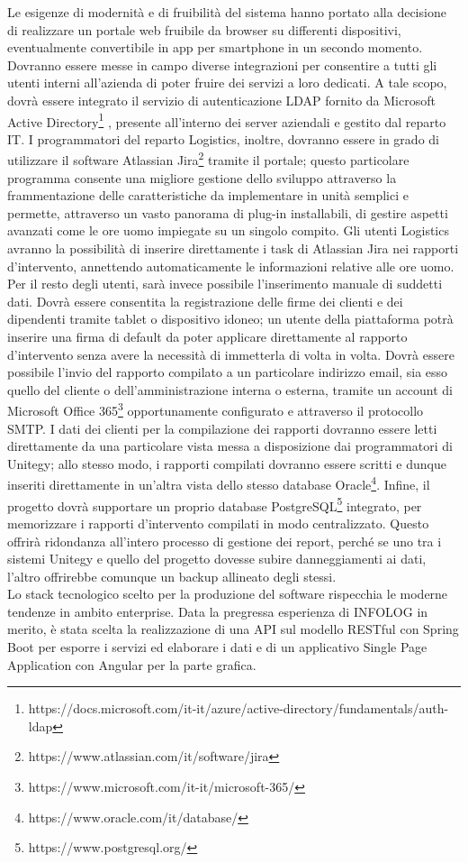 Le esigenze di modernità e di fruibilità del sistema hanno portato alla decisione di realizzare un portale web fruibile da browser su differenti dispositivi, eventualmente
convertibile in app per smartphone in un secondo momento.
Dovranno essere messe in campo diverse integrazioni per consentire a tutti gli utenti interni all'azienda di poter fruire dei servizi a loro dedicati.
A tale scopo, dovrà essere integrato il servizio di autenticazione LDAP fornito da Microsoft Active Directory\footnote{https://docs.microsoft.com/it-it/azure/active-directory/fundamentals/auth-ldap}
, presente all'interno dei server aziendali e gestito dal reparto IT.
I programmatori del reparto Logistics, inoltre, dovranno essere in grado di utilizzare il software Atlassian Jira\footnote{https://www.atlassian.com/it/software/jira} tramite il portale;
questo particolare programma consente una migliore gestione dello sviluppo attraverso la frammentazione delle caratteristiche da implementare in unità semplici e permette, attraverso
un vasto panorama di plug-in installabili, di gestire aspetti avanzati come le ore uomo impiegate su un singolo compito.
Gli utenti Logistics avranno la possibilità di inserire direttamente i task di Atlassian Jira nei rapporti d'intervento, annettendo automaticamente le informazioni relative alle ore uomo.
Per il resto degli utenti, sarà invece possibile l'inserimento manuale di suddetti dati.
Dovrà essere consentita la registrazione delle firme dei clienti e dei dipendenti tramite tablet o dispositivo idoneo; un utente della piattaforma potrà inserire una firma di default
da poter applicare direttamente al rapporto d'intervento senza avere la necessità di immetterla di volta in volta.
Dovrà essere possibile l'invio del rapporto compilato a un particolare indirizzo email, sia esso quello del cliente o dell'amministrazione interna o esterna, tramite un account di
Microsoft Office 365\footnote{https://www.microsoft.com/it-it/microsoft-365/} opportunamente configurato e attraverso il protocollo SMTP.
I dati dei clienti per la compilazione dei rapporti dovranno essere letti direttamente da una particolare vista messa a disposizione dai programmatori di Unitegy; allo stesso modo, 
i rapporti compilati dovranno essere scritti e dunque inseriti direttamente in un'altra vista dello stesso database Oracle\footnote{https://www.oracle.com/it/database/}.
Infine, il progetto dovrà supportare un proprio database PostgreSQL\footnote{https://www.postgresql.org/} integrato, per memorizzare i rapporti d'intervento compilati in modo centralizzato.
Questo offrirà ridondanza all'intero processo di gestione dei report, perché se uno tra i sistemi Unitegy e quello del progetto dovesse subire danneggiamenti ai dati, l'altro
offrirebbe comunque un backup allineato degli stessi.
\\
Lo stack tecnologico scelto per la produzione del software rispecchia le moderne tendenze in ambito enterprise.
Data la pregressa esperienza di INFOLOG in merito, è stata scelta la realizzazione di una API sul modello RESTful con Spring Boot per esporre i servizi ed elaborare i dati
e di un applicativo Single Page Application con Angular per la parte grafica.